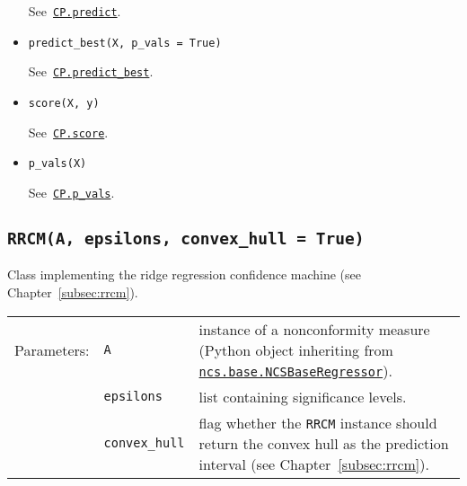 \documentclass[twoside,11pt]{article}
\begin{document}
\begin{appendices}
\begin{itemize}
          See~\hyperref[itm:cp_predict]
          {\texttt{CP.predict}}.
          \\

        \item
          \texttt{predict\_best(X, p\_vals = True)}

          See~\hyperref[itm:cp_predict_best]
          {\texttt{CP.predict\_best}}.
          \\

        \item
          \texttt{score(X, y)}

          See~\hyperref[itm:cp_score]
          {\texttt{CP.score}}.
          \\

        \item
          \texttt{p\_vals(X)}

          See~\hyperref[itm:cp_p_vals]
          {\texttt{CP.p\_vals}}.

      \end{itemize}

    \subsection*{\texttt{RRCM(A, epsilons,
                 convex\_hull = True)}}

      Class implementing the ridge regression confidence
      machine (see Chapter~\ref{subsec:rrcm}).
      \\

      \begin{tabu}{llX}
        Parameters: &\texttt{A}
                    &instance of a nonconformity
                     measure (Python object inheriting from
                     \hyperref[itm:ncsbaseregressor]
                     {\texttt{ncs.base.NCSBaseRegressor}}).
                     \\
                    &\texttt{epsilons}
                    &list containing significance levels.
                     \\
                    &\texttt{convex\_hull}
                    &flag whether the \texttt{RRCM}
                     instance should return the convex hull
                     as the prediction interval (see
                     Chapter~\ref{subsec:rrcm}).
      \end{tabu}


\end{appendices}
\end{document}
